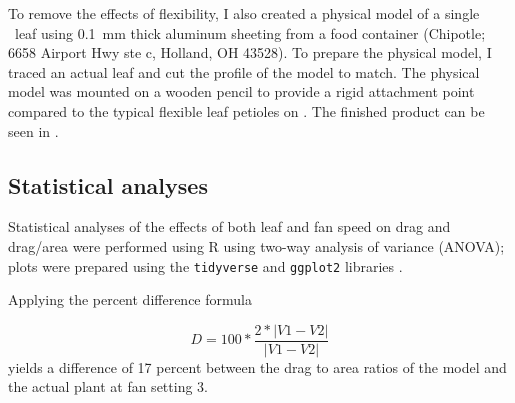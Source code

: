 To remove the effects of flexibility, I also created a physical model of a single \Cxparadisi\ leaf using \SI{0.1}{\milli\meter} thick aluminum sheeting from a food container (Chipotle; 6658 Airport Hwy ste c, Holland, OH 43528). To prepare the physical model, I traced an actual leaf and cut the profile of the model to match. The physical model was mounted on a wooden pencil to provide a rigid attachment point compared to the typical flexible leaf petioles on \Cxparadisi. The finished product can be seen in .

\subsection{Statistical analyses}
Statistical analyses of the effects of both leaf and fan speed on drag and drag/area were performed using R \citep{r2020} using two-way analysis of variance (ANOVA); plots were prepared using the \lstinline{tidyverse} and \lstinline{ggplot2} libraries \citep{wickham2019tidyverse}.

Applying the percent difference formula

\[D=100*\frac{2*|V1-V2|}{|V1-V2|}\]
yields a difference of 17 percent between the drag to area ratios of the model and the actual plant at fan setting 3. 








